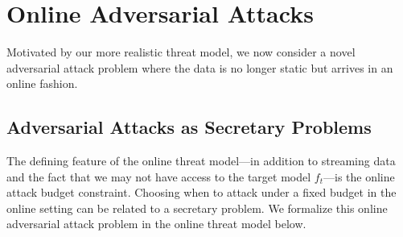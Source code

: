 \section{Online Adversarial Attacks}
\label{online_adversarial_attacks}
Motivated by our more realistic threat model, we now consider a novel adversarial attack problem where the data is no longer static but arrives in an online fashion.

\subsection{Adversarial Attacks as Secretary Problems}
\label{adv_sec_problem}
The defining feature of the online threat model---in addition to streaming data and the fact that we may not have access to the target model $f_t$---is the online attack budget constraint.
Choosing when to attack under a fixed budget in the online setting can be related to a secretary problem. We formalize this online adversarial attack problem in the online threat model below.


